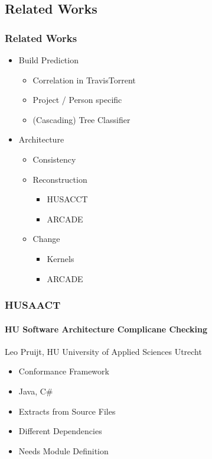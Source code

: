 \documentclass{beamer}
\begin{document}
\subsection{Related Works}
\begin{frame}
\frametitle{Related Works}


\begin{itemize}
	\item Build Prediction
	\begin{itemize}
		\item Correlation in TravisTorrent
		\item Project / Person specific
		\item (Cascading) Tree Classifier
	\end{itemize}
	\pause
	\item Architecture
	\begin{itemize}
		\item Consistency
		\item Reconstruction
		\begin{itemize}
			\item HUSACCT
			\item ARCADE
		\end{itemize}
		\item Change
		\begin{itemize}
			\item Kernels
			\item ARCADE
		\end{itemize}
	\end{itemize}
\end{itemize}

\end{frame}

\begin{frame}
	\frametitle{HUSAACT}
	\framesubtitle{HU Software Architecture Complicane Checking}
	
	Leo Pruijt, HU University of Applied Sciences Utrecht
	
	\begin{itemize}
			\item Conformance Framework
			\item Java, C\#
			\item Extracts from Source Files
			\item Different Dependencies
			\item Needs Module Definition
	\end{itemize}

\end{frame}
\end{document}
